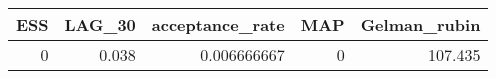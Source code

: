 \begin{longtable}{rrrrr}
\toprule
ESS & LAG\_30 & acceptance\_rate & MAP & Gelman\_rubin \\ 
\midrule
0 & 0.038 & 0.006666667 & 0 & 107.435 \\ 
\bottomrule
\end{longtable}

